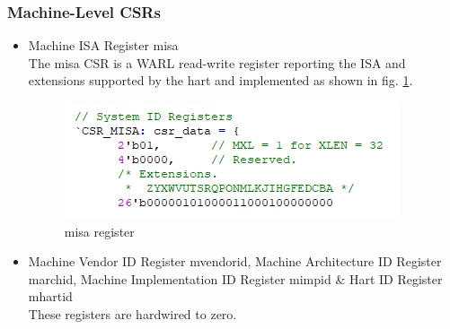 \documentclass[../main.tex]{subfiles}
\begin{document}
\subsubsection{Machine-Level CSRs}
\begin{itemize}
    \item Machine ISA Register misa\\
        The misa CSR is a WARL read-write register reporting the ISA and extensions supported by the hart and implemented as shown in fig. \ref{fig:misa}.
        \begin{figure}[h]
            \centering
                \includegraphics[width=10 cm]{diagrams/misa.png}
                \caption{misa register}
                \label{fig:misa}
        \end{figure}
    
    \item Machine Vendor ID Register mvendorid, Machine Architecture ID Register marchid, Machine Implementation ID Register mimpid & Hart ID Register mhartid\\
        These registers are hardwired to zero.\\


\end{itemize}
\end{document}
